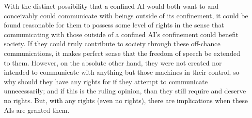 With the distinct possibility that a confined AI would both want to and conceivably could communicate with beings outside of its confinement, it could be found reasonable for them to possess some level of rights in the sense that communicating with those outside of a confined AI's confinement could benefit society. If they could truly contribute to society through these off-chance communications, it makes perfect sense that the freedom of speech be extended to them. However, on the absolute other hand, they were not created nor intended to communicate with anything but those machines in their control, so why should they have any rights for if they attempt to communicate unnecessarily; and if this is the ruling opinion, than they still require and deserve no rights. But, with any rights (even no rights), there are implications when these AIs are granted them.